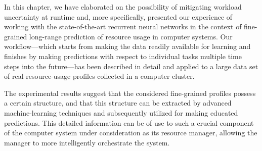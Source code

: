 In this chapter, we have elaborated on the possibility of mitigating workload
uncertainty at runtime and, more specifically, presented our experience of
working with the state-of-the-art recurrent neural networks in the context of
fine-grained long-range prediction of resource usage in computer systems. Our
workflow---which starts from making the data readily available for learning and
finishes by making predictions with respect to individual tasks multiple time
steps into the future---has been described in detail and applied to a large data
set of real resource-usage profiles collected in a computer cluster.

The experimental results suggest that the considered fine-grained profiles
possess a certain structure, and that this structure can be extracted by
advanced machine-learning techniques and subsequently utilized for making
educated predictions. This detailed information can be of use to such a crucial
component of the computer system under consideration as its resource manager,
allowing the manager to more intelligently orchestrate the system.
